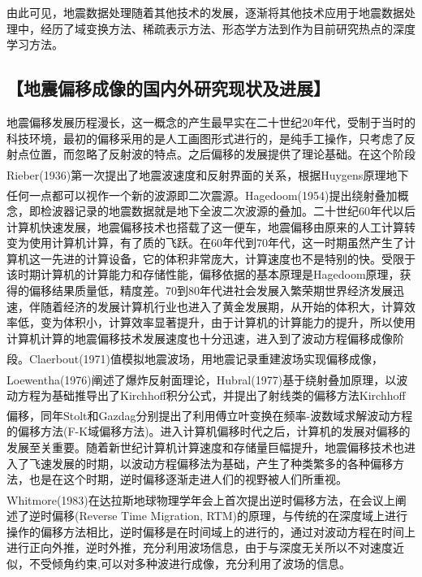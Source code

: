 \documentclass[11pt]{article}
\newcommand{\kai}{\CJKfamily{kai}}
\newcommand{\upcite}[1]{\textsuperscript{\textsuperscript{\cite{#1}}}}
\begin{document}
\par
由此可见，地震数据处理随着其他技术的发展，逐渐将其他技术应用于地震数据处理中，经历了域变换方法、稀疏表示方法、形态学方法到作为目前研究热点的深度学习方法。
\subsection*{\kai\fontsize{11pt}{10pt} \selectfont【地震偏移成像的国内外研究现状及进展】}
地震偏移发展历程漫长，这一概念的产生最早实在二十世纪20年代，受制于当时的科技环境，最初的偏移采用的是人工画图形式进行的，是纯手工操作，只考虑了反射点位置，而忽略了反射波的特点。之后偏移的发展提供了理论基础。在这个阶段Rieber\upcite{Rieber1936}(1936)第一次提出了地震波速度和反射界面的关系，根据Huygens原理地下任何一点都可以视作一个新的波源即二次震源。Hagedoom\upcite{Hagedoorn1954}(1954)提出绕射叠加概念，即检波器记录的地震数据就是地下全波二次波源的叠加。二十世纪60年代以后计算机快速发展，地震偏移技术也搭载了这一便车，地震偏移由原来的人工计算转变为使用计算机计算，有了质的飞跃。在60年代到70年代，这一时期虽然产生了计算机这一先进的计算设备，它的体积非常庞大，计算速度也不是特别的快。受限于该时期计算机的计算能力和存储性能，偏移依据的基本原理是Hagedoom原理，获得的偏移结果质量低，精度差。70到80年代进社会发展入繁荣期世界经济发展迅速，伴随着经济的发展计算机行业也进入了黄金发展期，从开始的体积大，计算效率低，变为体积小，计算效率显著提升，由于计算机的计算能力的提升，所以使用计算机计算的地震偏移技术发展速度也十分迅速，进入到了波动方程偏移成像阶段。Claerbout\upcite{Claerbout1971}(1971)值模拟地震波场，用地震记录重建波场实现偏移成像，Loewentha\upcite{Loewenthal1976}(1976)阐述了爆炸反射面理论，Hubral\upcite{Hubral1977}(1977)基于绕射叠加原理，以波动方程为基础推导出了Kirchhoff积分公式，并提出了射线类的偏移方法Kirchhoff偏移，同年Stolt\upcite{Stolt1978}和Gazdag\upcite{Gazdag1978}分别提出了利用傅立叶变换在频率-波数域求解波动方程的偏移方法(F-K域偏移方法)。进入计算机偏移时代之后，计算机的发展对偏移的发展至关重要。随着新世纪计算机计算速度和存储量巨幅提升，地震偏移技术也进入了飞速发展的时期，以波动方程偏移法为基础，产生了种类繁多的各种偏移方法，也是在这个时期，逆时偏移逐渐走进人们的视野被人们所重视。Whitmore\upcite{Whitmore1983}(1983)在达拉斯地球物理学年会上首次提出逆时偏移方法，在会议上阐述了逆时偏移(Reverse Time Migration, RTM)的原理，与传统的在深度域上进行操作的偏移方法相比，逆时偏移是在时间域上的进行的，通过对波动方程在时间上进行正向外推，逆时外推，充分利用波场信息，由于与深度无关所以不对速度近似，不受倾角约束,可以对多种波进行成像，充分利用了波场的信息。
\par
\end{document}
